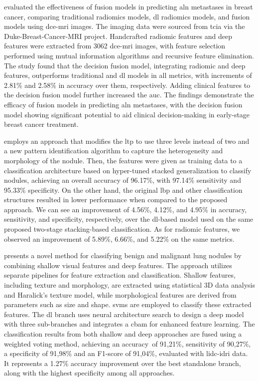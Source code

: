 \textcite{li_comparison_2022} evaluated the effectiveness of fusion models in predicting \ac{aln} metastases in breast cancer, comparing traditional radiomics models, \ac{dl} radiomics models, and fusion models using \ac{dce-mri} images. The imaging data were sourced from \ac{tcia} via the Duke-Breast-Cancer-MRI project. Handcrafted radiomic features and deep features were extracted from 3062 \ac{dce-mri} images, with feature selection performed using mutual information algorithms and recursive feature elimination. The study found that the decision fusion model, integrating radiomic and deep features, outperforms traditional and \ac{dl} models in all metrics, with increments of 2.81\% and 2.58\% in accuracy over them, respectively.
Adding clinical features to the decision fusion model further increased the \ac{auc}. The findings demonstrate the efficacy of fusion models in predicting \ac{aln} metastases, with the decision fusion model showing significant potential to aid clinical decision-making in early-stage breast cancer treatment.


\textcite{alksas_novel_2023} employs an approach that modifies the \ac{ltp} to use three levels instead of two and a new pattern identification algorithm to capture the heterogeneity and morphology of the nodule. Then, the features were given as training data to a classification architecture based on hyper-tuned stacked generalization to classify nodules, achieving an overall accuracy of 96.17\%, with 97.14\% sensitivity and 95.33\% specificity. On the other hand, the original \ac{lbp} and other classification structures resulted in lower performance when compared to the proposed approach.
We can see an improvement of 4.56\%, 4.12\%, and 4.95\% in accuracy, sensitivity, and specificity, respectively, over the \ac{dl}-based model used on the same proposed two-stage stacking-based classification. As for radiomic features, we observed an improvement of 5.89\%, 6.66\%, and 5.22\% on the same metrics.

\textcite{liu_classification_2023} presents a novel method for classifying benign and malignant lung nodules by combining shallow visual features and deep features. The approach utilizes separate pipelines for feature extraction and classification. Shallow features, including texture and morphology, are extracted using statistical 3D data analysis and Haralick's texture model, while morphological features are derived from parameters such as size and shape. \acp{svm} are employed to classify these extracted features. The \ac{dl} branch uses neural architecture search to design a deep model with three sub-branches and integrates a \ac{cbam} for enhanced feature learning. The classification results from both shallow and deep approaches are fused using a weighted voting method, achieving an accuracy\ of 91,21\%, sensitivity of 90,27\%, a specificity of 91,98\% and an F1-score of 91,04\%, evaluated with \ac{lidc-idri} data. It represents a 1.27\% accuracy improvement over the best standalone branch, along with the highest specificity among all approaches. 


